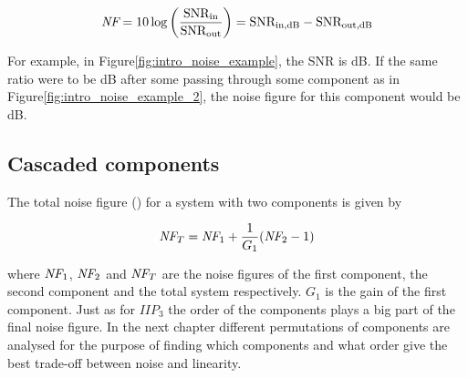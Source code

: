 			\begin{equation}
				\emph{NF}=10\log \left(\frac{ \text{SNR}_\text{in} }{ \text{SNR}_\text{out} }\right) = \text{SNR}_\text{in,dB} -\text{SNR}_\text{out,dB}
			\end{equation}
			
			For example, in Figure\autoref{fig:intro_noise_example}, the SNR is \unit[67]{dB}. If the same ratio were to be \unit[47]{dB} after some passing through some component as in Figure\autoref{fig:intro_noise_example_2}, the noise figure for this component would be \unit[20]{dB}.
			
		
		\subsection{Cascaded components}
			The total noise figure (\nf) for a system with two components is given by \autocite{pozar90}
			
			\begin{equation}
				\emph{NF}_T=\emph{NF}_1+\frac{1}{G_1}(\emph{NF}_2-1)
			\end{equation}
			
			where $\emph{NF}_1$, $\emph{NF}_2$ and $\emph{NF}_T$ are the noise figures of the first component, the second component and the total system respectively. $G_1$ is the gain of the first component. Just as for $IIP_3$ the order of the components plays a big part of the final noise figure. In the next chapter different permutations of components are analysed for the purpose of finding which components and what order give the best trade-off between noise and linearity.